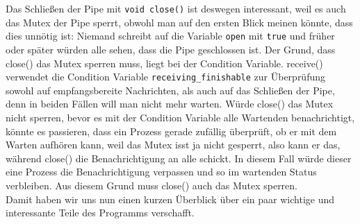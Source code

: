 Das Schließen der Pipe mit \verb|void close()| ist deswegen interessant, weil es auch das Mutex der Pipe sperrt, obwohl man auf den ersten Blick meinen könnte, dass dies
unnötig ist: Niemand schreibt auf die Variable \verb|open| mit \verb|true| und früher oder später würden alle sehen, dass die Pipe geschlossen ist.
Der Grund, dass close() das Mutex sperren muss, liegt bei der Condition Variable. receive() verwendet die Condition Variable \verb|receiving_finishable| zur Überprüfung sowohl auf
empfangsbereite Nachrichten, als auch auf das Schließen der Pipe, denn in beiden Fällen will man nicht mehr warten. Würde close() das Mutex nicht sperren, bevor es mit der
Condition Variable alle Wartenden benachrichtigt, könnte es passieren, dass ein Prozess gerade zufällig überprüft, ob er mit dem Warten aufhören kann, weil das Mutex isst ja
nicht gesperrt, also kann er das, während close() die Benachrichtigung an alle schickt. In diesem Fall würde dieser eine Prozess die Benachrichtigung verpassen und so
im wartenden Status verbleiben. Aus diesem Grund muss close() auch das Mutex sperren.
\\

Damit haben wir uns nun einen kurzen Überblick über ein paar wichtige und interessante Teile des Programms verschafft.
